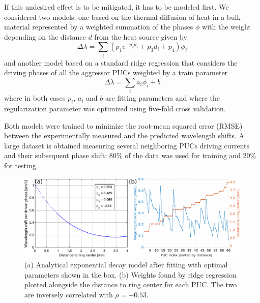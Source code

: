 If this undesired effect is to be mitigated, it has to be modeled first.
We considered two models: one based on the thermal diffusion of heat in a bulk material represented by a weighted summation of the phases \(\phi\) with the weight depending on
the distance \(d\) from the heat source \cite{jacques_optimization_2019} given by
\begin{equation}
	\Delta \lambda = \sum_i \left( p_1 e^{-p_2 d_i} + p_3 d_i + p_4 \right) \phi_i
	\label{eq:ch5-thermal_exp_fit}
\end{equation}
and another model based on a standard ridge regression that considers the driving phases of all the aggressor PUCs weighted by a train parameter
\begin{equation}
	\Delta \lambda = \sum_i a_i \phi_i + b
	\label{eq:ch5-thermal_ml_regressor}
\end{equation}
where in both cases \(p_i\), \(a_i\) and \(b\) are fitting parameters and where the regularization parameter was optimized using five-fold cross validation.

Both models were trained to minimize the root-mean squared error (RMSE) between the experimentally measured and the predicted wavelength shifts.
A large dataset is obtained measuring several neighboring PUCs driving currents and their subsequent phase shift: 80\% of the data was used for training and 20\% for testing.

\begin{figure}
	\begin{center}
		\includegraphics{figures/ch5-thermal_diffusion_correlation.pdf}
	\end{center}
	\caption{(a) Analytical  exponential decay model after fitting with optimal parameters shown in the box. (b) Weights found by ridge regression plotted alongside the distance to ring center for each PUC.
		The two are inversely correlated with \(\rho = -0.53\).
	}\label{fig:ch5-thermal_correlation}
\end{figure}


